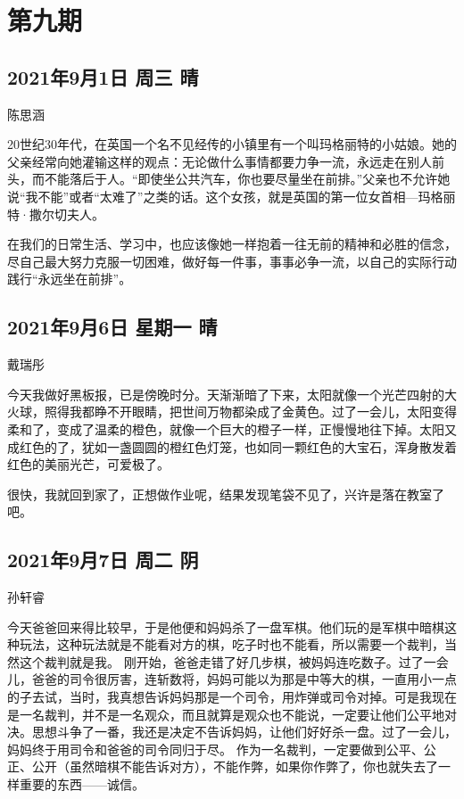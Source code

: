 \chapter{第九期}

\section{2021年9月1日 周三 晴}

陈思涵

20世纪30年代，在英国一个名不见经传的小镇里有一个叫玛格丽特的小姑娘。她的父亲经常向她灌输这样的观点：无论做什么事情都要力争一流，永远走在别人前头，而不能落后于人。“即使坐公共汽车，你也要尽量坐在前排。”父亲也不允许她说“我不能”或者“太难了”之类的话。这个女孩，就是英国的第一位女首相---玛格丽特·撒尔切夫人。

在我们的日常生活、学习中，也应该像她一样抱着一往无前的精神和必胜的信念，尽自己最大努力克服一切困难，做好每一件事，事事必争一流，以自己的实际行动践行“永远坐在前排”。

\section{2021年9月6日 星期一 晴}

戴瑞彤

今天我做好黑板报，已是傍晚时分。天渐渐暗了下来，太阳就像一个光芒四射的大火球，照得我都睁不开眼睛，把世间万物都染成了金黄色。过了一会儿，太阳变得柔和了，变成了温柔的橙色，就像一个巨大的橙子一样，正慢慢地往下掉。太阳又成红色的了，犹如一盏圆圆的橙红色灯笼，也如同一颗红色的大宝石，浑身散发着红色的美丽光芒，可爱极了。

很快，我就回到家了，正想做作业呢，结果发现笔袋不见了，兴许是落在教室了吧。

\section{2021年9月7日 周二 阴}

孙轩睿

今天爸爸回来得比较早，于是他便和妈妈杀了一盘军棋。他们玩的是军棋中暗棋这种玩法，这种玩法就是不能看对方的棋，吃子时也不能看，所以需要一个裁判，当然这个裁判就是我。
刚开始，爸爸走错了好几步棋，被妈妈连吃数子。过了一会儿，爸爸的司令很厉害，连斩数将，妈妈可能以为那是中等大的棋，一直用小一点的子去试，当时，我真想告诉妈妈那是一个司令，用炸弹或司令对掉。可是我现在是一名裁判，并不是一名观众，而且就算是观众也不能说，一定要让他们公平地对决。思想斗争了一番，我还是决定不告诉妈妈，让他们好好杀一盘。过了一会儿，妈妈终于用司令和爸爸的司令同归于尽。
作为一名裁判，一定要做到公平、公正、公开（虽然暗棋不能告诉对方），不能作弊，如果你作弊了，你也就失去了一样重要的东西——诚信。

